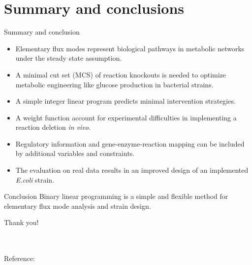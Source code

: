 \documentclass{beamer}
\begin{document}
\section{Summary and conclusions}
\begin{frame}{Summary and conclusion}
\begin{itemize}
    \item Elementary flux modes represent biological pathways 
        in metabolic networks under the steady state assumption.
    \pause
    \item A minimal cut set (MCS) of reaction knockouts is needed to optimize 
    metabolic engineering like glucose production in bacterial strains.
    \pause
    \item A simple integer linear program predicts minimal intervention strategies.
    \pause
    \item A weight function account for experimental difficulties in implementing a reaction deletion \emph{in vivo}.
    \pause
    \item Regulatory information and gene-enzyme-reaction mapping 
    can be included by additional variables and constraints.
    \pause
    \item The evaluation on real data results in an improved design  
    of an implemented \emph{E.coli} strain.
\end{itemize}	
\pause
\begin{block}{Conclusion}
    Binary linear programming is a simple and flexible method for 
    elementary flux mode analysis and strain design.
\end{block}
\end{frame}

\begin{frame}
\begin{center}    
    \nocite{Jungreuthmayer2012}
    \large Thank you!
\end{center}
 ~ \\
 ~ \\
\normalsize
Reference: \\


\end{frame}
\end{document}
